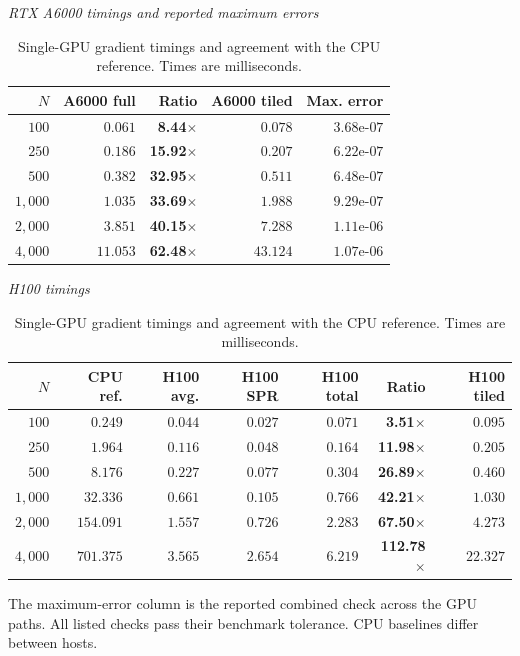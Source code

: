 \begin{table}[!htbp]
\centering\small
\setlength{\tabcolsep}{4pt}
\caption{Single-GPU gradient timings and agreement with the CPU reference. Times are milliseconds.}
\label{tab:cuda_a6000_verify}
\par\smallskip
\textit{RTX A6000 timings and reported maximum errors}\par\smallskip
\begin{tabular}{@{}rrrrr@{}}
\toprule
$N$ & A6000 full & Ratio & A6000 tiled & Max. error\\
\midrule
$100$ & $0.061$ & \textbf{8.44$\times$} & $0.078$ & $3.68\text{e-}07$\\
$250$ & $0.186$ & \textbf{15.92$\times$} & $0.207$ & $6.22\text{e-}07$\\
$500$ & $0.382$ & \textbf{32.95$\times$} & $0.511$ & $6.48\text{e-}07$\\
$1{,}000$ & $1.035$ & \textbf{33.69$\times$} & $1.988$ & $9.29\text{e-}07$\\
$2{,}000$ & $3.851$ & \textbf{40.15$\times$} & $7.288$ & $1.11\text{e-}06$\\
$4{,}000$ & $11.053$ & \textbf{62.48$\times$} & $43.124$ & $1.07\text{e-}06$\\
\bottomrule
\end{tabular}
\par\smallskip
\textit{H100 timings}\par\smallskip
\begin{tabular}{@{}rrrrrrr@{}}
\toprule
$N$ & CPU ref. & H100 avg. & H100 SPR & H100 total & Ratio & H100 tiled\\
\midrule
$100$ & $0.249$ & $0.044$ & $0.027$ & $0.071$ & \textbf{3.51$\times$} & $0.095$\\
$250$ & $1.964$ & $0.116$ & $0.048$ & $0.164$ & \textbf{11.98$\times$} & $0.205$\\
$500$ & $8.176$ & $0.227$ & $0.077$ & $0.304$ & \textbf{26.89$\times$} & $0.460$\\
$1{,}000$ & $32.336$ & $0.661$ & $0.105$ & $0.766$ & \textbf{42.21$\times$} & $1.030$\\
$2{,}000$ & $154.091$ & $1.557$ & $0.726$ & $2.283$ & \textbf{67.50$\times$} & $4.273$\\
$4{,}000$ & $701.375$ & $3.565$ & $2.654$ & $6.219$ & \textbf{112.78$\times$} & $22.327$\\
\bottomrule
\end{tabular}
\par\medskip\begin{minipage}{\linewidth}\footnotesize The maximum-error column is the reported combined check across the GPU paths. All listed checks pass their benchmark tolerance. CPU baselines differ between hosts.\end{minipage}
\end{table}

